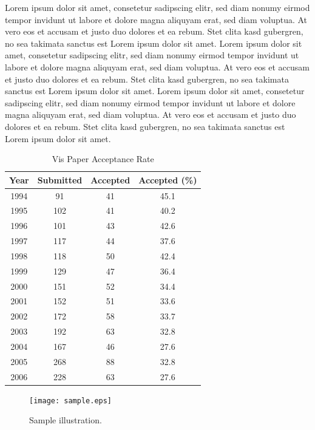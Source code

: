 \documentclass{vgtc}                          %
\begin{document}
Lorem ipsum dolor sit amet, consetetur sadipscing elitr, sed diam
nonumy eirmod tempor invidunt ut labore et dolore magna aliquyam erat,
sed diam voluptua. At vero eos et accusam et justo duo dolores et ea
rebum. Stet clita kasd gubergren, no sea takimata sanctus est Lorem
ipsum dolor sit amet. Lorem ipsum dolor sit amet, consetetur
sadipscing elitr, sed diam nonumy eirmod tempor invidunt ut labore et
dolore magna aliquyam erat, sed diam voluptua. At vero eos et accusam
et justo duo dolores et ea rebum. Stet clita kasd gubergren, no sea
takimata sanctus est Lorem ipsum dolor sit amet. Lorem ipsum dolor sit
amet, consetetur sadipscing elitr, sed diam nonumy eirmod tempor
invidunt ut labore et dolore magna aliquyam erat, sed diam
voluptua. At vero eos et accusam et justo duo dolores et ea
rebum. Stet clita kasd gubergren, no sea takimata sanctus est Lorem
ipsum dolor sit amet.

\begin{table}
  \caption{Vis Paper Acceptance Rate}
  \label{vis_accept}
  \scriptsize
  \begin{center}
    \begin{tabular}{cccc}
      Year & Submitted & Accepted & Accepted (\%)\\
    \hline
      1994 &  91 & 41 & 45.1\\
      1995 & 102 & 41 & 40.2\\
      1996 & 101 & 43 & 42.6\\
      1997 & 117 & 44 & 37.6\\
      1998 & 118 & 50 & 42.4\\
      1999 & 129 & 47 & 36.4\\
      2000 & 151 & 52 & 34.4\\
      2001 & 152 & 51 & 33.6\\
      2002 & 172 & 58 & 33.7\\
      2003 & 192 & 63 & 32.8\\
      2004 & 167 & 46 & 27.6\\
      2005 & 268 & 88 & 32.8\\
      2006 & 228 & 63 & 27.6
    \end{tabular}
  \end{center}
\end{table}

\begin{figure}[htb]
  \centering
  \texttt{[image: sample.eps]}
  \caption{Sample illustration.}
\end{figure}
\end{document}
